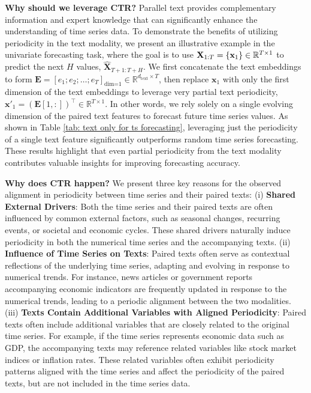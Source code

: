 \textbf{Why should we leverage CTR?} Parallel text provides complementary information and expert knowledge that can significantly enhance the understanding of time series data. To demonstrate the benefits of utilizing periodicity in the text modality, we present an illustrative example in the univariate forecasting task, where the goal is to use $\mathbf{X}_{1:T} = \{\mathbf{x}_1\} \in \mathbb{R}^{T \times 1}$ to predict the next $H$ values, $\widehat{\mathbf{X}}_{T+1: T+H}$. We first concatenate the text embeddings to form $\bm{E} = [e_1; e_2; \ldots; e_T]_{\text{dim=1}} \in \mathbb{R}^{d_\text{text} \times T}$, then replace $\bm{x}_1$ with only the first dimension of the text embeddings to leverage very partial text periodicity, $\bm{x}'_1 = (\bm{E}[1,:])^{\intercal} \in \mathbb{R}^{T \times 1}$. In other words, we rely solely on a single evolving dimension of the paired text features to forecast future time series values. 
As shown in Table \ref{tab: text only for ts forecasting}, leveraging just the periodicity of a single text feature significantly outperforms random time series forecasting. These results highlight that even partial periodicity from the text modality contributes valuable insights for improving forecasting accuracy.

\textbf{Why does CTR happen?} We present three key reasons for the observed alignment in periodicity between time series and their paired texts: (i) \textbf{Shared External Drivers}: Both the time series and their paired texts are often influenced by common external factors, such as seasonal changes, recurring events, or societal and economic cycles. 
These shared drivers naturally induce periodicity in both the numerical time series and the accompanying texts. (ii) \textbf{Influence of Time Series on Texts}: Paired texts often serve as contextual reflections of the underlying time series, adapting and evolving in response to numerical trends. For instance, news articles or government reports accompanying economic indicators are frequently updated in response to the numerical trends, leading to a periodic alignment between the two modalities.
(iii) \textbf{Texts Contain Additional Variables with Aligned Periodicity}: Paired texts often include additional variables that are closely related to the original time series. For example, if the time series represents economic data such as GDP, the accompanying texts may reference related variables like stock market indices or inflation rates. These related variables often exhibit periodicity patterns aligned with the time series and affect the periodicity of the paired texts, but are not included in the time series data.
